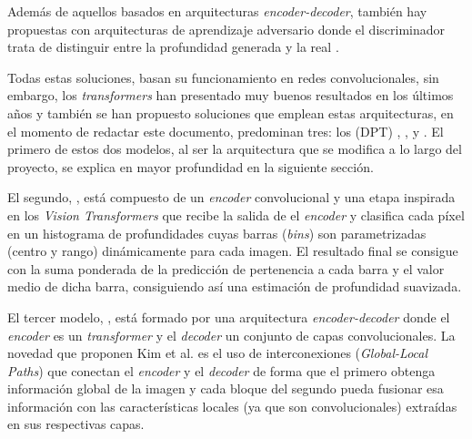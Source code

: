 Además de aquellos basados en arquitecturas \textit{encoder-decoder}, también hay propuestas con arquitecturas de aprendizaje adversario \cite{gan} donde el discriminador trata de distinguir entre la profundidad generada y la real \cite{gan-depth}.

Todas estas soluciones, basan su funcionamiento en redes convolucionales, sin embargo, los \textit{transformers} han presentado muy buenos resultados en los últimos años y también se han propuesto soluciones que emplean estas arquitecturas, en el momento de redactar este documento, predominan tres: los  (DPT) \cite{visiontransformersDPT},  \cite{bhat2020adabins}, y  \cite{glpdepth}. El primero de estos dos modelos, al ser la arquitectura que se modifica a lo largo del proyecto, se explica en mayor profundidad en la siguiente sección. 

El segundo, , está compuesto de un \textit{encoder} convolucional y una etapa inspirada en los \textit{Vision Transformers} \cite{image16x16words} que recibe la salida de el \textit{encoder} y clasifica cada píxel en un histograma de profundidades cuyas barras (\textit{bins}) son parametrizadas (centro y rango) dinámicamente para cada imagen. El resultado final se consigue con la suma ponderada de la predicción de pertenencia a cada barra y el valor medio de dicha barra, consiguiendo así una estimación de profundidad suavizada. 

El tercer modelo, , está formado por una arquitectura \textit{encoder-decoder} donde el \textit{encoder} es un \textit{transformer} y el \textit{decoder} un conjunto de capas convolucionales. La novedad que proponen Kim et al. \cite{glpdepth} es el uso de interconexiones (\textit{Global-Local Paths}) que conectan el \textit{encoder} y el \textit{decoder} de forma que el primero obtenga información global de la imagen y cada bloque del segundo pueda fusionar esa información con las características locales (ya que son convolucionales) extraídas en sus respectivas capas.


